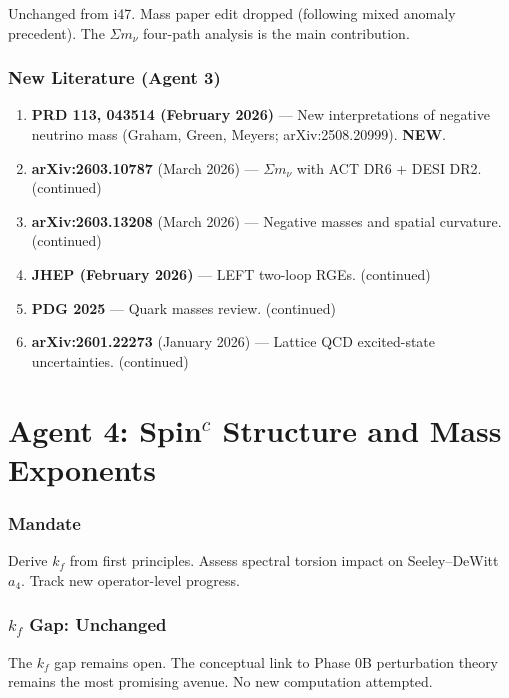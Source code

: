 \documentclass[11pt,a4paper]{article}
\newcommand{\NEW}{\textcolor{dfdblue}{\textbf{NEW}}}
\begin{document}
Unchanged from i47. Mass paper edit dropped (following mixed anomaly precedent). The $\Sigma m_\nu$ four-path analysis is the main contribution.

\section{New Literature (Agent 3)}

\begin{enumerate}
\item \textbf{PRD 113, 043514 (February 2026)} --- New interpretations of negative neutrino mass (Graham, Green, Meyers; arXiv:2508.20999). \NEW.
\item \textbf{arXiv:2603.10787} (March 2026) --- $\Sigma m_\nu$ with ACT DR6 + DESI DR2. (continued)
\item \textbf{arXiv:2603.13208} (March 2026) --- Negative masses and spatial curvature. (continued)
\item \textbf{JHEP (February 2026)} --- LEFT two-loop RGEs. (continued)
\item \textbf{PDG 2025} --- Quark masses review. (continued)
\item \textbf{arXiv:2601.22273} (January 2026) --- Lattice QCD excited-state uncertainties. (continued)
\end{enumerate}


\part{Agent 4: Spin$^c$ Structure and Mass Exponents}
\label{part:agent4}

\section{Mandate}

Derive $k_f$ from first principles. Assess spectral torsion impact on Seeley--DeWitt $a_4$. Track new operator-level progress.

\section{$k_f$ Gap: Unchanged}

The $k_f$ gap remains open. The conceptual link to Phase 0B perturbation theory remains the most promising avenue. No new computation attempted.
\end{document}
